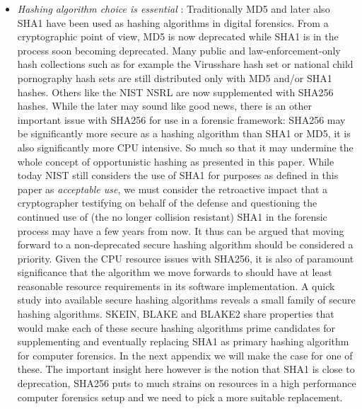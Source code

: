 \begin{itemize}
\item \emph{Hashing algorithm choice is essential} :  Traditionally MD5 and later also SHA1 have been used as hashing algorithms in digital forensics. From a cryptographic point of view, MD5 is now deprecated while SHA1 is in the process soon becoming deprecated. Many public and law-enforcement-only hash collections such as for example the Virusshare hash set or national child pornography hash sets are still distributed only with MD5 and/or SHA1 hashes. Others like the NIST NSRL are now supplemented with SHA256 hashes. While the later may sound like good news, there is an other important issue with SHA256 for use in a forensic framework: SHA256 may be significantly more secure as a hashing algorithm than SHA1 or MD5, it is also significantly more CPU intensive. So much so that it may undermine the whole concept of opportunistic hashing as presented in this paper. While today NIST still considers the use of SHA1 for purposes as defined in this paper as \emph{acceptable use}, we must consider the retroactive impact that a cryptographer testifying on behalf of the defense and questioning the continued use of (the no longer collision resistant) SHA1 in the forensic process may have a few years from now. It thus can be argued that moving forward to a non-deprecated secure hashing algorithm should be considered a priority. Given the CPU resource issues with SHA256, it is also of paramount significance that the algorithm we move forwards to should have at least reasonable resource requirements in its software implementation. A quick study into available secure hashing algorithms reveals a small family of secure hashing algorithms. SKEIN, BLAKE and BLAKE2 share properties that would make each of these secure hashing algorithms prime candidates for supplementing and eventually replacing SHA1 as primary hashing algorithm for computer forensics. In the next appendix we will make the case for one of these. The important insight here however is the notion that SHA1 is close to deprecation, SHA256 puts to much strains on resources in a high performance computer forensics setup and we need to pick a more suitable replacement.     
\end{itemize}

